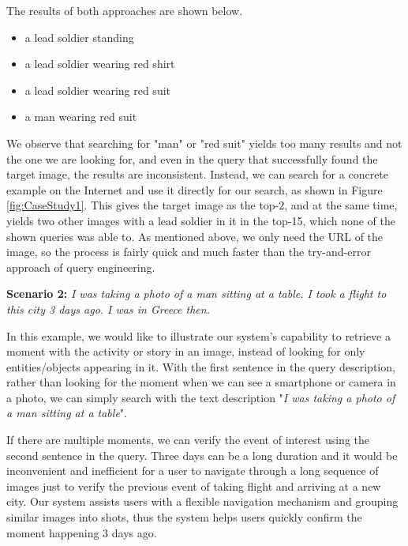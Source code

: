 The results of both approaches are shown below.
\begin{itemize}
  \item[] a lead soldier standing \xmark
  \item[] a lead soldier wearing red shirt \xmark
  \item[] a lead soldier wearing red suit \cmark
  \item[] a man wearing red suit \xmark
\end{itemize}



We observe that searching for "man" or "red suit" yields too many results and not the one we are looking for, and even in the query that successfully found the target image, the results are inconsistent. Instead, we can search for a concrete example on the Internet and use it directly for our search, as shown in Figure \ref{fig:CaseStudy1}. This gives the target image as the top-2, and at the same time, yields two other images with a lead soldier in it in the top-15, which none of the shown queries was able to. As mentioned above, we only need the URL of the image, so the process is fairly quick and much faster than the try-and-error approach of query engineering.




\textbf{Scenario 2:} \textit{I was taking a photo of a man sitting at a table. I took a flight to this city 3 days ago. I was in Greece then.}

\vspace{-2mm}
In this example, we would like to illustrate our system's capability to retrieve a moment with the activity or story in an image, instead of looking for only entities/objects appearing in it. With the first sentence in the query description, rather than looking for the moment when we can see a smartphone or camera in a photo, we can simply search with the text description "\textit{I was taking a photo of a man sitting at a table}". 

\vspace{-2mm}
If there are multiple moments, we can verify the event of interest using the second sentence in the query. Three days can be a long duration and it would be inconvenient and inefficient for a user to navigate through a long sequence of images just to verify the previous event of taking flight and arriving at a new city. Our system assists users with a flexible navigation mechanism and grouping similar images into shots, thus the system helps users quickly confirm the moment happening 3 days ago. 


